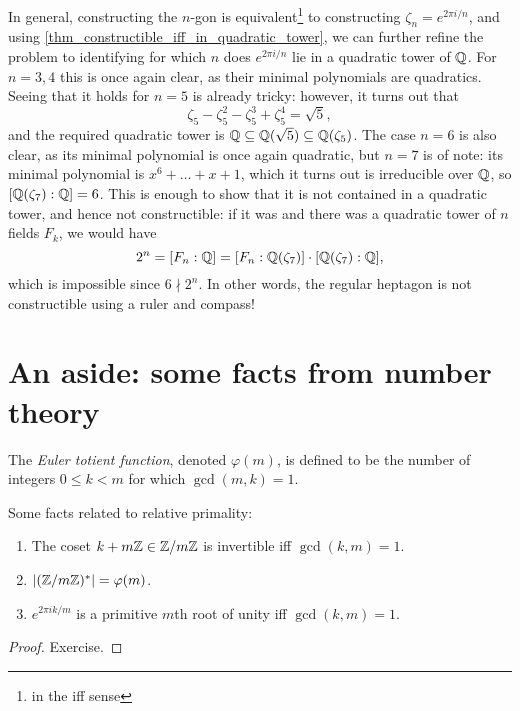 In general, constructing the $n$-gon is equivalent\footnote{in the iff sense} to constructing $\zeta_n = e^{2 \pi i/n}$, and using \cref{thm_constructible_iff_in_quadratic_tower}, we can further refine the problem to identifying for which $n$ does $e^{2 \pi i/n}$ lie in a quadratic tower of $\mathbb{{Q}}$. For $n = 3, 4$ this is once again clear, as their minimal polynomials are quadratics. Seeing that it holds for $n = 5$ is already tricky: however, it turns out that
\[
    \zeta_5 - \zeta_5^2 - \zeta_5^3 + \zeta_5^4 = \sqrt{5},
\]
and the required quadratic tower is $\mathbb{{Q}} \subseteq \mathbb{{Q}}(\sqrt{5}) \subseteq \mathbb{{Q}}(\zeta_5)$. The case $n = 6$ is also clear, as its minimal polynomial is once again quadratic, but $n = 7$ is of note: its minimal polynomial is $x^6 + \ldots + x + 1$, which it turns out is irreducible over $\mathbb{{Q}}$, so $[\mathbb{{Q}}(\zeta_7) : \mathbb{{Q}}] = 6$. This is enough to show that it is not contained in a quadratic tower, and hence not constructible: if it was and there was a quadratic tower of $n$ fields $F_k$, we would have
\[
    2^n = [F_n : \mathbb{{Q}}] = [F_n : \mathbb{{Q}}(\zeta_7)] \cdot [\mathbb{{Q}}(\zeta_7) : \mathbb{{Q}}],
\]
which is impossible since $6 \nmid 2^n$. In other words, the regular heptagon is not constructible using a ruler and compass!

\section{An aside: some facts from number theory}

\begin{definition}
   The \emph{Euler totient function}, denoted $\varphi(m)$, is defined to be the number of integers $0 \leq k < m$ for which $\gcd(m, k) = 1$.
\end{definition}

\begin{proposition}
    Some facts related to relative primality:
    \begin{enumerate}[label=(\alph*)]
        \item The coset $k + m\mathbb{{Z}} \in \mathbb{{Z}}/{{m}}\mathbb{{Z}}$ is invertible iff $\gcd(k, m) = 1$.
        \item $|(\mathbb{{Z}}/{{m}}\mathbb{{Z}})^*| = \varphi(m)$.
        \item $e^{2 \pi i k/m}$ is a primitive $m$th root of unity iff $\gcd(k, m) = 1$.
    \end{enumerate}
\end{proposition}

\begin{proof}
    Exercise.
\end{proof}

